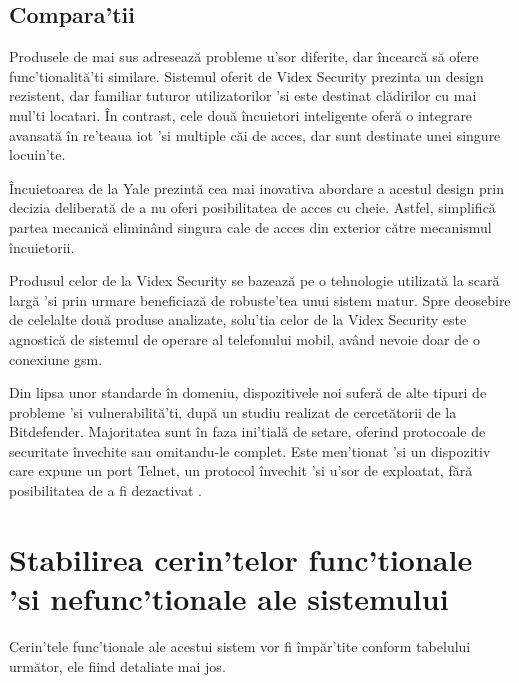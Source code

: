 \subsection {Compara'tii}

Produsele de mai sus adresează probleme u'sor diferite, dar încearcă să ofere func'tionalită'ti similare. Sistemul oferit de Videx Security prezinta un design rezistent, dar familiar tuturor utilizatorilor 'si este destinat clădirilor cu mai mul'ti locatari. În contrast, cele două încuietori inteligente oferă o integrare avansată în re'teaua \acrshort{iot} 'si multiple căi de acces, dar sunt destinate unei singure locuin'te.

Încuietoarea de la Yale prezintă cea mai inovativa abordare a acestul design prin decizia deliberată de a nu oferi posibilitatea de acces cu cheie. Astfel, simplifică partea mecanică eliminând singura cale de acces din exterior către mecanismul încuietorii.

Produsul celor de la Videx Security se bazează pe o tehnologie utilizată la scară largă 'si prin urmare beneficiază de robuste'tea unui sistem matur. Spre deosebire de celelalte două produse analizate, solu'tia celor de la Videx Security este agnostică de sistemul de operare al telefonului mobil, având nevoie doar de o conexiune \acrshort{gsm}.

Din lipsa unor standarde în domeniu, dispozitivele noi suferă de alte tipuri de probleme 'si vulnerabilită'ti, după un studiu realizat de cercetătorii de la Bitdefender. Majoritatea sunt în faza ini'tială de setare, oferind protocoale de securitate învechite sau omitandu-le complet. Este men'tionat 'si un dispozitiv care expune un port Telnet, un protocol învechit 'si u'sor de exploatat, fără posibilitatea de a fi dezactivat \cite{Bitdefender2016IoT}.

\section {Stabilirea cerin'telor func'tionale 'si nefunc'tionale ale sistemului}

Cerin'tele func'tionale ale acestui sistem vor fi împăr'tite conform tabelului următor, ele fiind detaliate mai jos.

